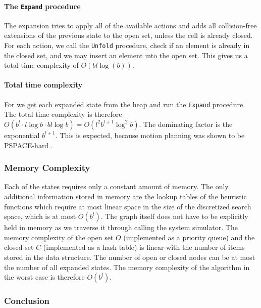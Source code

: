 \paragraph{The \texttt{Expand} procedure}
The expansion tries to apply all of the available actions and adds all collision-free extensions of the previous state to the open set, unless the cell is already closed. For each action, we call the \texttt{Unfold} procedure, check if an element is already in the closed set, and we may insert an element into the open set. This gives us a total time complexity of $O(bl \log(b))$.

\paragraph{Total time complexity} For we get each expanded state from the heap and run the \texttt{Expand} procedure. The total time complexity is therefore $O(b^l \cdot l\log b \cdot bl \log b)=O(l^{2}b^{l+1}\log^2 b)$. The dominating factor is the exponential $b^{l+1}$. This is expected, because motion planning was shown to be PSPACE-hard \cite[Chapter~6.5.1]{lavalle_2006}.

\subsubsection{Memory Complexity}

Each of the states requires only a constant amount of memory. The only additional information stored in memory are the lookup tables of the heuristic functions which require at most linear space in the size of the discretized search space, which is at most $O(b^l)$. The graph itself does not have to be explicitly held in memory as we traverse it through calling the system simulator. The memory complexity of the open set $O$ (implemented as a priority queue) and the closed set $C$ (implemented as a hash table) is linear with the number of items stored in the data structure. The number of open or closed nodes can be at most the number of all expanded states. The memory complexity of the algorithm in the worst case is therefore $O(b^l)$.

\subsubsection{Conclusion}

